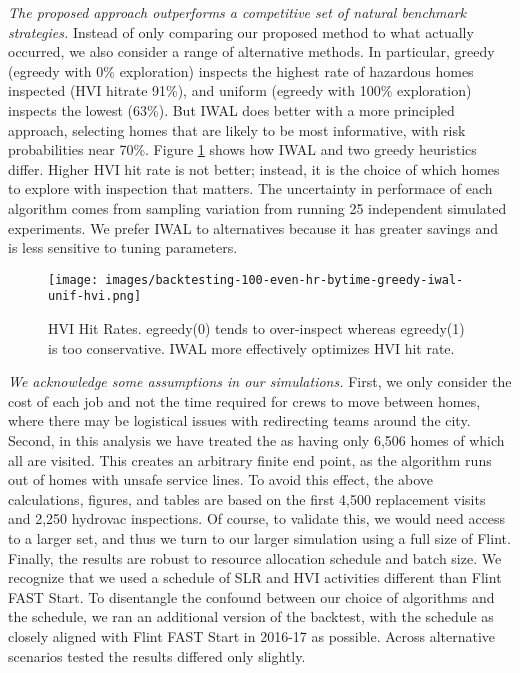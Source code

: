 \documentclass[sigconf]{acmart}
\begin{document}
\emph{The proposed approach outperforms a competitive set of natural benchmark strategies.} Instead of only comparing our proposed method to what actually occurred, we also consider a range of alternative methods. In particular, greedy (egreedy with 0\% exploration) inspects the highest rate of hazardous homes inspected (HVI hitrate 91\%), and uniform (egreedy with 100\% exploration) inspects the lowest (63\%). But IWAL does better with a more principled approach, selecting homes that are likely to be most informative, with risk probabilities near 70\%. Figure \ref{fig:backtesting-100-even-hr-bytime-greedy-iwal-unif} shows how IWAL and two greedy heuristics differ. Higher HVI hit rate is not better; instead, it is the choice of which homes to explore with inspection that matters. The uncertainty in performace of each algorithm comes from sampling variation from running 25 independent simulated experiments. We prefer IWAL to alternatives because it has greater savings and is less sensitive to tuning parameters.


\begin{figure}[!ht]
\begin{center}
\texttt{[image: images/backtesting-100-even-hr-bytime-greedy-iwal-unif-hvi.png]}
\end{center}
\caption{HVI Hit Rates. egreedy(0) tends to over-inspect whereas egreedy(1) is too conservative. IWAL more effectively optimizes HVI hit rate.}
\label{fig:backtesting-100-even-hr-bytime-greedy-iwal-unif}
\end{figure}


\emph{We acknowledge some assumptions in our simulations.} First, we only consider the cost of each job and not the time required for crews to move between homes, where there may be logistical issues with redirecting teams around the city. Second, in this analysis we have treated the \ActualFlint as having only 6,506 homes of which all are visited. This creates an arbitrary finite end point, as the algorithm runs out of homes with unsafe service lines. To avoid this effect, the above calculations, figures, and tables are based on the first 4,500 replacement visits and 2,250 hydrovac inspections. Of course, to validate this, we would need access to a larger set, and thus we turn to our larger simulation using a full size of Flint. Finally, the results are robust to resource allocation schedule and batch size. We recognize that we used a schedule of SLR and HVI activities different than Flint FAST Start. To disentangle the confound between our choice of algorithms and the schedule, we ran an additional version of the \ActualFlint backtest, with the schedule as closely aligned with Flint FAST Start in 2016-17 as possible. Across alternative scenarios tested the results differed only slightly.
\end{document}
